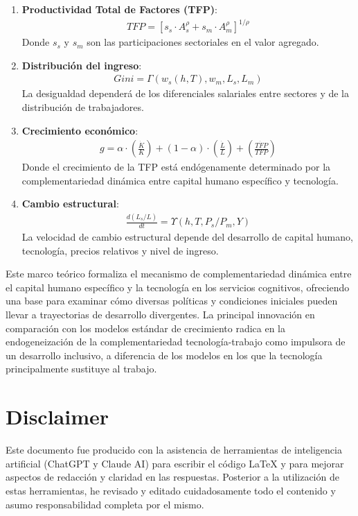 \documentclass{article}
\theoremstyle{remark}
\theoremstyle{definition}
\begin{document}
\begin{tcolorbox}
\begin{enumerate}
\item \textbf{Productividad Total de Factores (TFP)}:
\begin{align}
TFP = [s_s \cdot A_s^{\rho} + s_m \cdot A_m^{\rho}]^{1/\rho}
\end{align}
Donde $s_s$ y $s_m$ son las participaciones sectoriales en el valor agregado.

\item \textbf{Distribución del ingreso}:
\begin{align}
Gini = \Gamma(w_s(h,T), w_m, L_s, L_m)
\end{align}
La desigualdad dependerá de los diferenciales salariales entre sectores y de la distribución de trabajadores.

\item \textbf{Crecimiento económico}:
\begin{align}
g = \alpha \cdot \left(\frac{\dot{K}}{K}\right) + (1-\alpha) \cdot \left(\frac{\dot{L}}{L}\right) + \left(\frac{\dot{TFP}}{TFP}\right)
\end{align}
Donde el crecimiento de la TFP está endógenamente determinado por la complementariedad dinámica entre capital humano específico y tecnología.

\item \textbf{Cambio estructural}:
\begin{align}
\frac{d(L_s/L)}{dt} = \Upsilon(h, T, P_s/P_m, Y)
\end{align}
La velocidad de cambio estructural depende del desarrollo de capital humano, tecnología, precios relativos y nivel de ingreso.
\end{enumerate}

Este marco teórico formaliza el mecanismo de complementariedad dinámica entre el capital humano específico y la tecnología en los servicios cognitivos, ofreciendo una base para examinar cómo diversas políticas y condiciones iniciales pueden llevar a trayectorias de desarrollo divergentes. La principal innovación en comparación con los modelos estándar de crecimiento radica en la endogeneización de la complementariedad tecnología-trabajo como impulsora de un desarrollo inclusivo, a diferencia de los modelos en los que la tecnología principalmente sustituye al trabajo.
\end{tcolorbox}

\nocite{*}

\printbibliography

\section*{Disclaimer}

Este documento fue producido con la asistencia de herramientas de inteligencia artificial (ChatGPT y Claude AI) para escribir el código LaTeX y para mejorar aspectos de redacción y claridad en las respuestas. Posterior a la utilización de estas herramientas, he revisado y editado cuidadosamente todo el contenido y asumo responsabilidad completa por el mismo.
\end{document}
